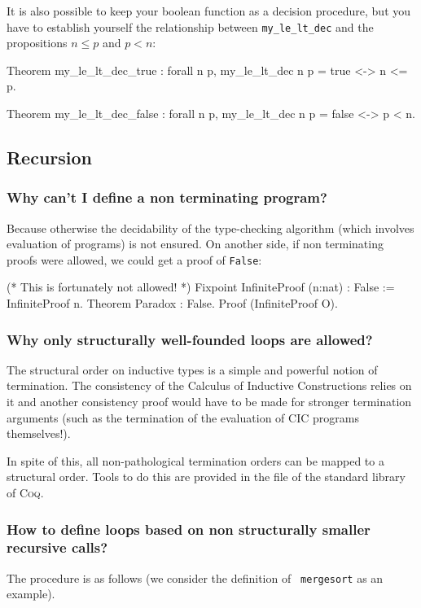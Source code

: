 \documentclass[a4paper,pdftex]{article}
\def\Question#1{\stepcounter{question}\subsubsection{#1}}
\def\Coq{\textsc{Coq}}
\newcommand\vfile[2]{\ahref{#1}{\tt {#2}.v}}
\begin{document}
It is also possible to keep your boolean function as a decision procedure,
but you have to establish yourself the relationship between \texttt{my\_le\_lt\_dec} and the propositions $n\leq p$ and $p<n$:

\begin{coq_example*}
Theorem my_le_lt_dec_true : 
    forall n p, my_le_lt_dec n p = true <-> n <= p.

Theorem  my_le_lt_dec_false : 
   forall n p, my_le_lt_dec n p = false <-> p < n.
\end{coq_example*}


\subsection{Recursion}

\Question{Why can't I define a non terminating program?}

 Because otherwise the decidability of the type-checking
algorithm (which involves evaluation of programs) is not ensured.  On
another side, if non terminating proofs were allowed, we could get a
proof of {\tt False}:

\begin{coq_example*}
(* This is fortunately not allowed! *)
Fixpoint InfiniteProof (n:nat) : False := InfiniteProof n.
Theorem Paradox : False.
Proof (InfiniteProof O).
\end{coq_example*}


\Question{Why only structurally well-founded loops are allowed?}

 The structural order on inductive types is a simple and
powerful notion of termination. The consistency of the Calculus of
Inductive Constructions relies on it and another consistency proof
would have to be made for stronger termination arguments (such
as the termination of the evaluation of CIC programs themselves!).

In spite of this, all non-pathological termination orders can be mapped
to a structural order. Tools to do this are provided in the file 
\vfile{\InitWf}{Wf} of the standard library of {\Coq}.

\Question{How to define loops based on non structurally smaller
recursive calls?}

 The procedure is as follows (we consider the definition of {\tt
mergesort} as an example).
\end{document}
